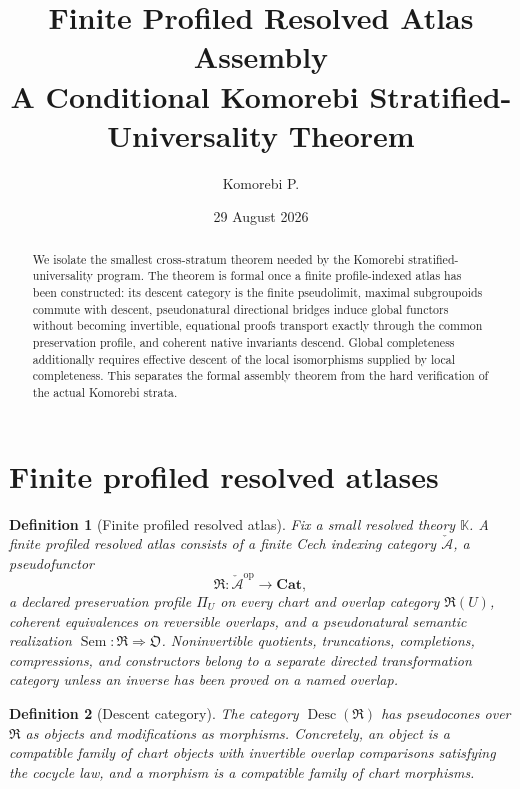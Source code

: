 \documentclass[11pt]{article}
\title{Finite Profiled Resolved Atlas Assembly\\A Conditional Komorebi Stratified-Universality Theorem}
\author{Komorebi P.}
\date{29 August 2026}
\newtheorem{definition}{Definition}[section]
\newcommand{\Desc}{\operatorname{Desc}}
\newcommand{\Cat}{\mathbf{Cat}}
\begin{document}
\maketitle

\begin{abstract}
We isolate the smallest cross-stratum theorem needed by the Komorebi stratified-universality program.  The theorem is formal once a finite profile-indexed atlas has been constructed: its descent category is the finite pseudolimit, maximal subgroupoids commute with descent, pseudonatural directional bridges induce global functors without becoming invertible, equational proofs transport exactly through the common preservation profile, and coherent native invariants descend.  Global completeness additionally requires effective descent of the local isomorphisms supplied by local completeness.  This separates the formal assembly theorem from the hard verification of the actual Komorebi strata.
\end{abstract}

\section{Finite profiled resolved atlases}

\begin{definition}[Finite profiled resolved atlas]
Fix a small resolved theory $\mathbb K$.  A finite profiled resolved atlas consists of a finite Cech indexing category $\check{\mathcal A}$, a pseudofunctor
\[
\mathfrak R:\check{\mathcal A}^{\mathrm{op}}\longrightarrow\Cat,
\]
a declared preservation profile $\Pi_U$ on every chart and overlap category $\mathfrak R(U)$, coherent equivalences on reversible overlaps, and a pseudonatural semantic realization $\operatorname{Sem}:\mathfrak R\Rightarrow\mathfrak O$.  Noninvertible quotients, truncations, completions, compressions, and constructors belong to a separate directed transformation category unless an inverse has been proved on a named overlap.
\end{definition}

\begin{definition}[Descent category]
The category $\Desc(\mathfrak R)$ has pseudocones over $\mathfrak R$ as objects and modifications as morphisms.  Concretely, an object is a compatible family of chart objects with invertible overlap comparisons satisfying the cocycle law, and a morphism is a compatible family of chart morphisms.
\end{definition}
\end{document}
